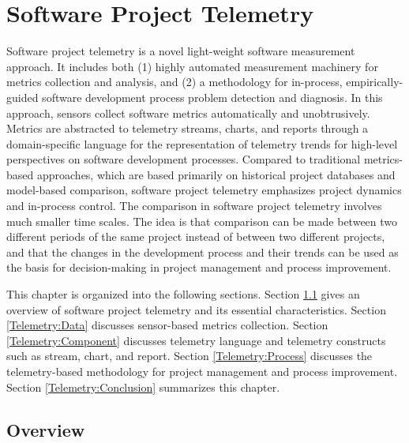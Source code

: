 \chapter{Software Project Telemetry}
\label{Chapter:Telemetry}

Software project telemetry is a novel light-weight software measurement approach. It includes both (1) highly automated measurement machinery for metrics collection and analysis, and (2) a methodology for in-process, empirically-guided software development process problem detection and diagnosis. In this approach, sensors collect software metrics automatically and unobtrusively. Metrics are abstracted to telemetry streams, charts, and reports through a domain-specific language for the representation of telemetry trends for high-level perspectives on software development processes. 
Compared to traditional metrics-based approaches, which are based primarily on historical project databases and model-based comparison, software project telemetry emphasizes project dynamics and in-process control. The comparison in software project telemetry involves much smaller time scales. The idea is that comparison can be made between two different periods of the same project instead of between two different projects, and that the changes in the development process and their trends can be used as the basis for decision-making in project management and process improvement.

This chapter is organized into the following sections. 
Section \ref{Telemetry:Overview} gives an overview of software project telemetry and its essential characteristics.
Section \ref{Telemetry:Data} discusses sensor-based metrics collection. 
Section \ref{Telemetry:Component} discusses telemetry language and telemetry constructs such as stream, chart, and report.
Section \ref{Telemetry:Process} discusses the telemetry-based methodology for 
        project management and process improvement.
Section \ref{Telemetry:Conclusion} summarizes this chapter.






\section{Overview} 
\label{Telemetry:Overview}

